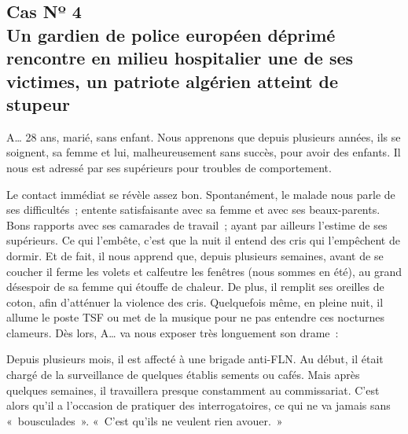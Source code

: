 \documentclass[french,twoside]{book} %
\begin{document}
\subsection[{Cas Nº 4. Un gardien de police européen déprimé rencontre en milieu hospitalier une de ses victimes, un patriote algérien atteint de stupeur}]{Cas Nº 4 \\
Un gardien de police européen déprimé rencontre en milieu hospitalier une de ses victimes, un patriote algérien atteint de stupeur}
\noindent A… 28 ans, marié, sans enfant. Nous apprenons que depuis plusieurs années, ils se soignent, sa femme et lui, malheureusement sans succès, pour avoir des enfants. Il nous est adressé par ses supérieurs pour troubles de comportement.\par
Le contact immédiat se révèle assez bon. Spontanément, le malade nous parle de ses difficultés ; entente satisfaisante avec sa femme et avec ses beaux-parents. Bons rapports avec ses camarades de travail ; ayant par ailleurs l’estime de ses supérieurs. Ce qui l’embête, c’est que la nuit il entend des cris qui l’empêchent de dormir. Et de fait, il nous apprend que, depuis plusieurs semaines, avant de se coucher il ferme les volets et calfeutre les fenêtres (nous sommes en été), au grand désespoir de sa femme qui étouffe de chaleur. De plus, il remplit ses oreilles de coton, afin d’atténuer la violence des cris. Quelquefois même, en pleine nuit, il allume le poste TSF ou met de la musique pour ne pas entendre ces nocturnes clameurs. Dès lors, A… va nous exposer très longuement son drame :\par
Depuis plusieurs mois, il est affecté à une brigade anti-FLN. Au début, il était chargé de la surveillance de quelques établis   sements ou cafés. Mais après quelques semaines, il travaillera presque constamment au commissariat. C’est alors qu’il a l’occasion de pratiquer des interrogatoires, ce qui ne va jamais sans « bousculades ». « C’est qu’ils ne veulent rien avouer. »\par
\bigbreak
\end{document}
